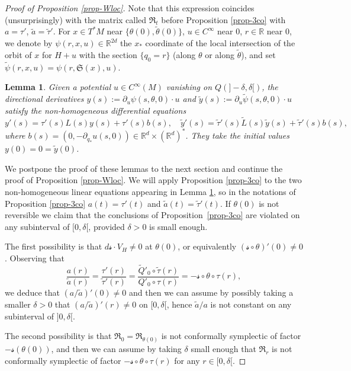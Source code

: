 \documentclass[JEP,XML,SOM,Unicode,published]{cedram}
\newcommand{\Rm}{\mathbb{R}}
\newcommand{\gR}{\ensuremath{\mathfrak{R}}}
\newcommand{\gS}{\ensuremath{\mathfrak{S}}}
\newcommand{\ms}{\ensuremath{\mathscr{s}}}
\theoremstyle{plain}
\newtheorem{lem}{Lemma}
\theoremstyle{definition}
\begin{document}
\begin{proof}[Proof of Proposition \ref{prop-Wloc}]
Note that this expression coincides (unsurprisingly) with the matrix called $\gR_t$ before Proposition \ref{prop-3co}
with $a =\tau'$, $\tilde a =\tilde \tau '$.
For $x\in T^*M$ near $\{\theta(0),\tilde \theta(0)\}$, $u\in C^{\infty}$ near $0$, $r\in \Rm$ near $0$, we denote by $\psi(r,x,u)\in \Rm^{2d}$ the $x_*$ coordinate of the local intersection
of the orbit of $x$ for $H+u$ with the section $\{q_0=r\}$ (along $\theta$ or along $\tilde \theta$), and set
$\tilde \psi(r,x,u)=\psi(r,\gS(x),u)$.

\begin{lem}\label{lem-diff} Given a potential $u\in C^{\infty}(M)$ vanishing on $Q(]-\delta, \delta[)$, the directional derivatives
$y(s):= \partial_{u}\psi(s,\theta, 0)\cdot u$ and $\tilde y(s):= \partial_{u}\tilde \psi(s,\theta, 0)\cdot u$ satisfy the non-homogeneous differential equations
\[
y'(s)= \tau'(s)L(s)y(s)+\tau'(s)b(s), \quad
\tilde y'(s)= \tilde \tau '(s)\tilde L(s)\tilde y(s)+\tilde \tau'(s)b(s),
\]
where $b(s)= (0,-\partial_{q_*}u(s,0))\in \Rm^d \times (\Rm^d)^*$. They take the initial values $y(0)=0=\tilde y(0)$.
\end{lem}

We postpone the proof of these lemmas to the next section and continue the proof of Proposition \ref{prop-Wloc}.
We will apply Proposition \ref{prop-3co} to the two non-homogeneous linear equations appearing in Lemma \ref{lem-diff}, so
in the notations of Proposition \ref{prop-3co} $a(t)=\tau'(t)$ and $\tilde a (t)= \tilde \tau'(t)$.
If $\theta(0)$ is not reversible
we claim that the conclusions of Proposition~\ref{prop-3co} are violated on any subinterval of $[0, \delta[$, provided $\delta>0$
is small enough.

The first possibility is that $d\ms\cdot V_H\neq 0$ at $\theta(0)$,
or equivalently $(\ms\circ \theta)'(0)\neq 0$.
Observing that
\[
\frac{a(r)}{\tilde a(r)}= \frac{\tau' (r)}{\tilde \tau'(r)}=\frac{\tilde Q'_0 \circ \tilde\tau (r)}{Q'_0\circ \tau(r)}=
-\ms\circ \theta\circ \tau(r),
\]
we deduce that $(a/\tilde a)'(0)\neq 0$ and then we can assume by possibly taking a smaller $\delta>0$ that
$(a /\tilde a)'(r)\neq 0$
on $[0, \delta[$, hence $\tilde a/a$ is not constant on any subinterval of $]0, \delta[$.

The second possibility is that $\gR_0=\gR_{\theta(0)}$ is not conformally symplectic of factor $-\ms(\theta(0))$, and then we can assume by taking $\delta$ small enough
that $\gR_r$ is not conformally symplectic of factor $-\ms\circ \theta\circ \tau(r) $ for any $r\in [0,\delta[$.


\end{proof}
\end{document}
